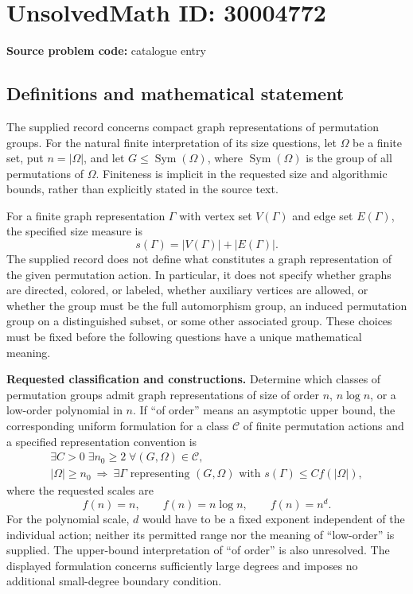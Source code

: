 \documentclass[11pt]{article}
\begin{document}
\section*{UnsolvedMath ID: 30004772}
\textbf{Source problem code:} catalogue entry
\subsection{Definitions and mathematical statement}
The supplied record concerns compact graph representations of permutation groups. For the natural finite interpretation of its size questions, let \(\Omega\) be a finite set, put \(n=|\Omega|\), and let \(G\leq\operatorname{Sym}(\Omega)\), where \(\operatorname{Sym}(\Omega)\) is the group of all permutations of \(\Omega\). Finiteness is implicit in the requested size and algorithmic bounds, rather than explicitly stated in the source text.

For a finite graph representation \(\Gamma\) with vertex set \(V(\Gamma)\) and edge set \(E(\Gamma)\), the specified size measure is
\[
s(\Gamma)=|V(\Gamma)|+|E(\Gamma)|.
\]
The supplied record does not define what constitutes a graph representation of the given permutation action. In particular, it does not specify whether graphs are directed, colored, or labeled, whether auxiliary vertices are allowed, or whether the group must be the full automorphism group, an induced permutation group on a distinguished subset, or some other associated group. These choices must be fixed before the following questions have a unique mathematical meaning.

\textbf{Requested classification and constructions.} Determine which classes of permutation groups admit graph representations of size of order \(n\), \(n\log n\), or a low-order polynomial in \(n\). If ``of order'' means an asymptotic upper bound, the corresponding uniform formulation for a class \(\mathcal C\) of finite permutation actions and a specified representation convention is
\[
\begin{gathered}
\exists C>0\;\exists n_0\geq 2\;\forall (G,\Omega)\in\mathcal C,\\
|\Omega|\geq n_0\ \Longrightarrow\
\exists\Gamma\text{ representing }(G,\Omega)
\text{ with }s(\Gamma)\leq C f(|\Omega|),
\end{gathered}
\]
where the requested scales are
\[
f(n)=n,\qquad f(n)=n\log n,\qquad f(n)=n^d.
\]
For the polynomial scale, \(d\) would have to be a fixed exponent independent of the individual action; neither its permitted range nor the meaning of ``low-order'' is supplied. The upper-bound interpretation of ``of order'' is also unresolved. The displayed formulation concerns sufficiently large degrees and imposes no additional small-degree boundary condition.
\end{document}
